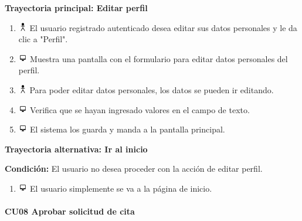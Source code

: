 \textbf{Trayectoria principal: Editar perfil}
\begin{enumerate}
\item \includegraphics[height=1em]{pictures/actor.png} El usuario registrado autenticado desea editar sus datos personales y le da clic a "Perfil".
\item \includegraphics[height=1em]{pictures/sistema.png} Muestra una pantalla con el formulario para editar datos personales del perfil.
\item \includegraphics[height=1em]{pictures/actor.png} Para poder editar datos personales, los datos se pueden ir editando.
\item \includegraphics[height=1em]{pictures/sistema.png} Verifica que se hayan ingresado valores en el campo de texto.
\item \includegraphics[height=1em]{pictures/sistema.png} El sistema los guarda y manda a la pantalla principal.
\end{enumerate} \bigskip


\textbf{Trayectoria alternativa: Ir al inicio} 

\vspace{0.3em}

\textbf{Condición:} El usuario no desea proceder con la acción de editar perfil.
\begin{enumerate}
\item \includegraphics[height=1em]{pictures/sistema.png} El usuario simplemente se va a la página de inicio.
\end{enumerate} \bigskip

\paragraph{CU08 Aprobar solicitud de cita}


